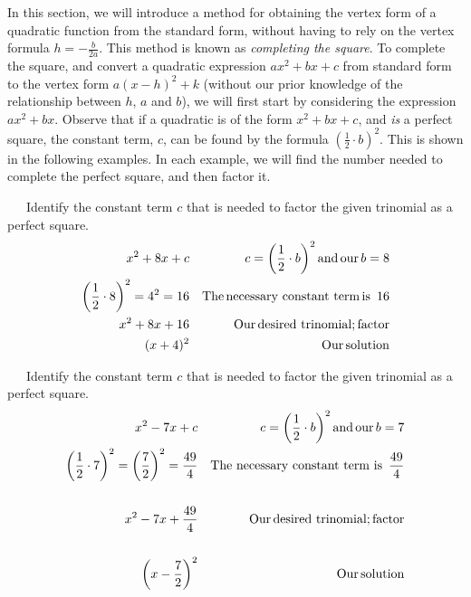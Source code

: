 {}\pp

In this section, we will introduce a method for obtaining the vertex form of a quadratic function from the standard form, without having to rely on the vertex formula $h=-\displaystyle\frac{b}{2a}$.  This method is known as \textit{completing the square}.  To complete the square, and convert a quadratic expression $ax^2+bx+c$ from standard form to the vertex form $a(x-h)^2+k$ (without our prior knowledge of the relationship between $h$, $a$ and $b$), we will first start by considering the expression $ax^2+bx$.\pp
Observe that if a quadratic is of the form $x^2 + b x + c$, and \textit{is} a perfect square, the constant
term, $c$, can be found by the formula $\left( \frac{1}{2} \cdot b
\right)^2$. This is shown in the following examples.  In each example, we will find the number
needed to complete the perfect square, and then factor it.

\begin{example}~~~Identify the constant term $c$ that is needed to factor the given trinomial as a perfect square.
  \begin{eqnarray*}
    x^2 + 8 x + c &  & c = \left( \frac{1}{2} \cdot b \right)^2 \operatorname{and}
    \operatorname{our} b = 8\\
    \left( \frac{1}{2} \cdot 8 \right)^2 = 4^2 = 16 &  & \operatorname{The}
    \operatorname{necessary~constant~term} \operatorname{is~} 16\\
    x^2 + 8 x + 16 &  & \operatorname{Our} \operatorname{desired~trinomial}; \operatorname{factor}\\
    (x + 4)^2 &  & \operatorname{Our} \operatorname{solution}
  \end{eqnarray*}
\end{example}

\begin{example}~~~Identify the constant term $c$ that is needed to factor the given trinomial as a perfect square.
  \begin{eqnarray*}
    x^2 - 7 x + c &  & c = \left( \frac{1}{2} \cdot b \right)^2 \operatorname{and}
    \operatorname{our} b = 7\\
    \left( \frac{1}{2} \cdot 7 \right)^2 = \left( \frac{7}{2} \right)^2 =
    \frac{49}{4} &  & \operatorname{The~necessary~constant~term~is~} \frac{49}{4}\\
    &  & \\
    x^2 - 7 x + \frac{49}{4} &  & \operatorname{Our} \operatorname{desired~trinomial}; \operatorname{factor}\\
    &  & \\
    \left( x - \frac{7}{2} \right)^2 &  & \operatorname{Our} \operatorname{solution}
  \end{eqnarray*}
\end{example}

